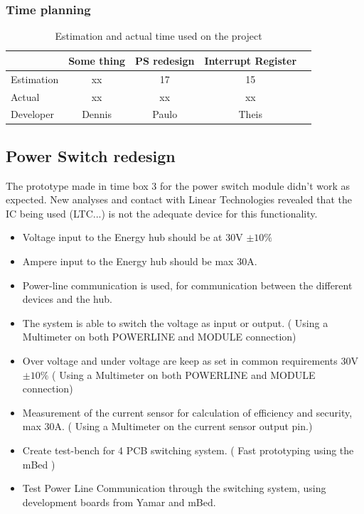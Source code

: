 \subsubsection{Time planning}
\begin{table}[H]
\centering
	\begin{tabular}{|l|c|c|c|c|}
		\hline
		~			& Some thing	& PS redesign	& Interrupt Register \\ \hline
		Estimation	& xx			& 17				& 15			 \\
		Actual		& xx			& xx				& xx			 \\
		Developer	& Dennis		& Paulo			& Theis				 \\
		\hline
	\end{tabular}
	\caption{Estimation and actual time used on the project}
\end{table}

\subsection{Power Switch redesign}
The prototype made in time box 3 for the power switch module didn't work as expected. New analyses and contact with Linear Technologies revealed that the IC being used (LTC...) is not the adequate device for this functionality.

\begin{itemize}
	\item Voltage input to the Energy hub should be at 30V $ \pm10\% $
	\item Ampere input to the Energy hub should be max 30A.
	\item Power-line communication is used, for communication between the different devices and the hub.
\end{itemize}

\begin{itemize}
	\item The system is able to switch the voltage as input or output. ( Using a Multimeter on both POWERLINE and MODULE connection)
	\item Over voltage and under voltage are keep as set in common requirements 30V $ \pm10\% $ ( Using a Multimeter on both POWERLINE and MODULE connection)
	\item Measurement of the current sensor for calculation of efficiency and security, max 30A. ( Using a Multimeter on the current sensor output pin.)
	\item Create test-bench for 4 PCB switching system. ( Fast prototyping using the mBed )
	\item Test Power Line Communication through the switching system, using development boards from Yamar and mBed.
\end{itemize}
%
%
